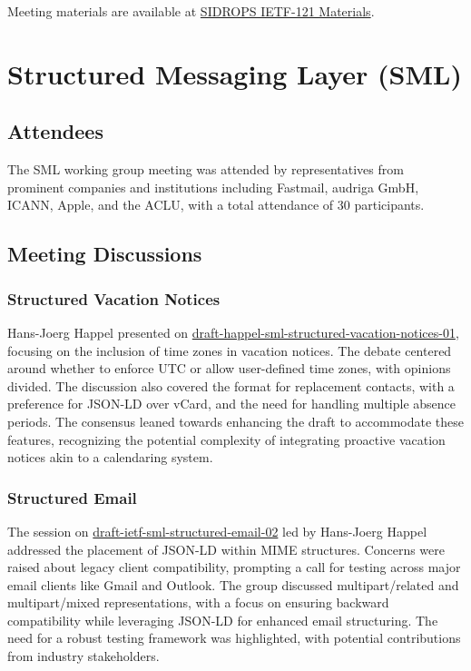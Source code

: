 \documentclass{article}
\begin{document}
Meeting materials are available at \href{https://example.com/sidrops-ietf121-materials}{SIDROPS IETF-121 Materials}.



\newpage

\section{Structured Messaging Layer (SML)}

\subsection{Attendees}

The SML working group meeting was attended by representatives from prominent companies and institutions including Fastmail, audriga GmbH, ICANN, Apple, and the ACLU, with a total attendance of 30 participants.

\subsection{Meeting Discussions}

\subsubsection{Structured Vacation Notices}

Hans-Joerg Happel presented on \href{https://datatracker.ietf.org/doc/html/draft-happel-sml-structured-vacation-notices-01}{draft-happel-sml-structured-vacation-notices-01}, focusing on the inclusion of time zones in vacation notices. The debate centered around whether to enforce UTC or allow user-defined time zones, with opinions divided. The discussion also covered the format for replacement contacts, with a preference for JSON-LD over vCard, and the need for handling multiple absence periods. The consensus leaned towards enhancing the draft to accommodate these features, recognizing the potential complexity of integrating proactive vacation notices akin to a calendaring system.

\subsubsection{Structured Email}

The session on \href{https://datatracker.ietf.org/doc/html/draft-ietf-sml-structured-email-02}{draft-ietf-sml-structured-email-02} led by Hans-Joerg Happel addressed the placement of JSON-LD within MIME structures. Concerns were raised about legacy client compatibility, prompting a call for testing across major email clients like Gmail and Outlook. The group discussed multipart/related and multipart/mixed representations, with a focus on ensuring backward compatibility while leveraging JSON-LD for enhanced email structuring. The need for a robust testing framework was highlighted, with potential contributions from industry stakeholders.
\end{document}
